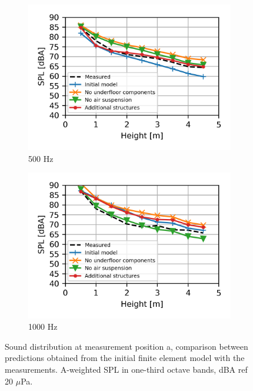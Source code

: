 \begin{figure}[H]
\begin{subfigure}[b]{0.49\textwidth}
		\includegraphics{fig/chap5/geometry_variation/third_octave_over_height/500_Hz.png}
		\caption{500 Hz}
	\end{subfigure}
	\begin{subfigure}[b]{0.49\textwidth}
		\centering
		\includegraphics{fig/chap5/geometry_variation/third_octave_over_height/1000_Hz.png}
		\caption{1000 Hz}
	\end{subfigure}
	\caption{Sound distribution at measurement position a, comparison between predictions obtained from the initial finite element model with the measurements. A-weighted SPL in one-third octave bands, dBA ref 20 $\mu$Pa.}
	\label{fig:third_octave_over_height_geometry_variation}
\end{figure}


